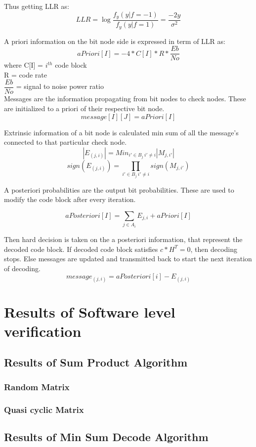 \documentclass[twopage,12pt,a4paper]{report}
\begin{document}
\begin{raggedright}
Thus getting LLR as:
 \[  LLR = \log\dfrac{f_y(y|f=-1)}{f_y(y|f=1)} = \dfrac{-2y}{\sigma^2}\]
 
A priori information on the bit node side is expressed in term of LLR as: 
\[  aPriori[I] = -4 * C[I] * R * \dfrac{Eb}{No} \]
where C[I] = $i^{th}$ code block\\
R = code rate\\
$\dfrac{Eb}{No}$ = signal to noise power ratio\\
	
Messages are the information propagating from bit nodes to check nodes.
These are initialized to a priori of their respective bit node.	
 \[ message[I][J] = aPriori[I] \]
 
Extrinsic information of a bit node is calculated min sum of all the message's connected to 
	that particular check node. 
 \[ |E_{(j,i)}| =  Min_{i'\in B_j \ i'\neq i }|M_{j,i'}|   \] 
 \[ sign({E_{(j,i)}}) =  \prod_{i'\in B_j \ i'\neq i }sign(M_{j,i'})   \]
 
A posteriori probabilities are the output bit probabilities.
These are used to modify the code block after every iteration.

\[  aPosteriori[I] = \sum_{j\in A_i} E_{j,i} + aPriori[I] \]
	
Then hard decision is taken on the a posteriori information, that represent the decoded code block.
If decoded code block satisfies $c*H^{T} = 0 $, then decoding stops. Else messages are updated and transmitted back to start the next iteration of decoding.
\[   message_{(j,i)} = aPosteriori[i] - E_{(j,i)}  \]	

\chapter{Results of Software level verification}
\section{Results of Sum Product Algorithm}
\subsection{Random Matrix}

\subsection{Quasi cyclic Matrix}

\section{Results of Min Sum Decode Algorithm}

\end{raggedright}
\end{document}
